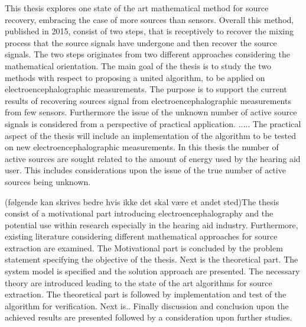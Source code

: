 This thesis explores one state of the art mathematical method for source recovery, embracing the case of more sources than sensors. 
Overall this method, published in 2015, consist of two steps, that is receptively to recover the mixing process that the source signals have undergone and then recover the source signals.
The two steps originates from two different approaches considering the mathematical orientation. 
The main goal of the thesis is to study the two methods with respect to proposing a united algorithm, to be applied on electroencephalographic measurements. The purpose is to support the current results of recovering sources signal from electroencephalographic measurements from few sensors. Furthermore the issue of the unknown number of active source signals is considered from a perspective of practical application.      
.....
The practical aspect of the thesis will include an implementation of the algorithm to be tested on new electroencephalographic measurements. 
In this thesis the number of active sources are sought related to the amount of energy used by the hearing aid user.   
This includes considerations upon the issue of the true number of active sources being unknown. 

(følgende kan skrives bedre hvis ikke det skal være et andet sted)The thesis consist of a motivational part introducing  electroencephalography and the potential use within research especially in the hearing aid industry. Furthermore, existing literature considering different mathematical approaches for source extraction are examined. The Motivational part is concluded by the problem statement specifying the objective of the thesis.
Next is the theoretical part. The system model is specified and the solution approach are presented. The necessary theory are introduced leading to the state of the art algorithms for source extraction.   
The theoretical part is followed by implementation and test of the algorithm for verification. 
Next is..
Finally discussion and conclusion upon the achieved results are presented followed by a consideration upon further studies.    
       
      





              

